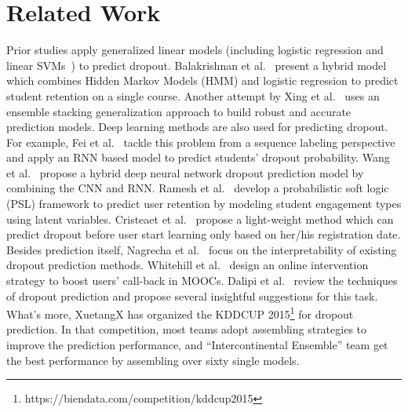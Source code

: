 \section{Related Work}

  Prior studies apply generalized linear models (including logistic regression and linear SVMs~\cite{Kloft2014,He:2015:IAS:2886521.2886563}) to predict dropout. Balakrishnan et al.~\cite{balakrishnan2013predicting} present a hybrid model which combines Hidden Markov Models (HMM) and logistic regression  to predict student retention on a single course. Another attempt by Xing et al.~\cite{xing2016temporal} uses an ensemble stacking generalization approach to build robust and accurate prediction models.
Deep learning methods are also used for predicting dropout. For example, Fei et al.~\cite{Fei2015} tackle this problem from a sequence labeling perspective and apply an RNN based model to predict students' dropout probability. Wang et al.~\cite{wang2017deep} propose a hybrid deep neural network dropout prediction model by combining the CNN and RNN.
	Ramesh et al.~\cite{Ramesh:2014:LLE:2893873.2894071} develop a probabilistic soft logic (PSL) framework to predict user retention by modeling student engagement types using latent variables. Cristeaet et al.~\cite{cristea2018earliest} propose a light-weight method which can predict dropout before user start learning only based on her/his registration date.
Besides prediction itself, Nagrecha et al.~\cite{Nagrecha:2017:MDP:3041021.3054162}  focus on the interpretability of existing  dropout prediction methods. Whitehill et al.~\cite{whitehill2015beyond} design an online intervention strategy to boost users' call-back in MOOCs. Dalipi et al.~\cite{dalipi2018mooc} review the techniques of dropout prediction and propose several insightful suggestions for this task. What's more, XuetangX has organized the KDDCUP 2015\footnote{https://biendata.com/competition/kddcup2015} for dropout prediction. In that competition, most teams adopt assembling strategies to improve the prediction performance, and ``Intercontinental Ensemble'' team get the best performance by assembling over sixty single models.
	 
